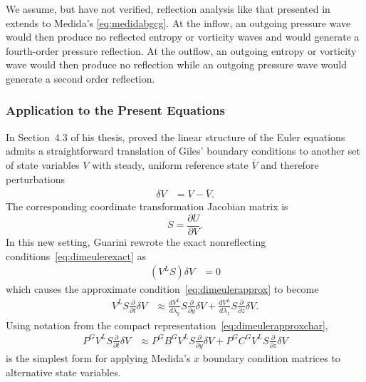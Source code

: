 We assume, but have not verified, reflection analysis like that presented in
\citet[\textsection{}3.7.4]{Giles1988Nonreflecting} extends to Medida's
\eqref{eq:medidabgcg}.  At the inflow, an outgoing pressure wave
would then produce no reflected entropy or vorticity waves and would generate a
fourth-order pressure reflection.  At the outflow, an outgoing entropy or
vorticity wave would then produce no reflection while an outgoing pressure wave
would generate a second order reflection.

\subsubsection{Application to the Present Equations}

In Section~4.3 of his thesis, \citet{Guarini1998} proved the linear
structure of the Euler equations admits a straightforward translation of Giles'
boundary conditions to another set of state variables $V$ with steady, uniform
reference state $\bar{V}$ and therefore perturbations
\begin{align}
  \label{eq:gilesperturbV}
  \delta{}V &= V - \bar{V}.
\end{align}
The corresponding coordinate transformation Jacobian matrix is
\[
   S = \frac{\partial\!U}{\partial\!V}.
\]
In this new setting, Guarini rewrote the exact nonreflecting
conditions~\eqref{eq:dimeulerexact} as
\begin{align}
  \left(V^L S\right) \delta{}V &= 0
\end{align}
which causes the approximate condition~\eqref{eq:dimeulerapprox} to become
\begin{align}
\label{eq:dimeulertransform}
  V^L
  S
  \frac{\partial\!}{\partial\!t}
  \delta{}V
  &\approx
  \frac{dV^L}{d\lambda_y}
  S
  \frac{\partial\!}{\partial\!y}
  \delta{}V
  +
  \frac{dV^L}{d\lambda_z}
  S
  \frac{\partial\!}{\partial\!z}
  \delta{}V.
\end{align}
Using notation from the compact representation~\eqref{eq:dimeulerapproxchar},
\begin{align}
\label{eq:dimeulertransformcharnot}
  P^G V^L S
  \frac{\partial\!}{\partial\!t}
  \delta{}V
  &\approx
  P^G B^G V^L S
  \frac{\partial\!}{\partial\!y}
  \delta{}V
  +
  P^G C^G V^L S
  \frac{\partial\!}{\partial\!z}
  \delta{}V
\end{align}
is the simplest form for applying Medida's $x$ boundary condition matrices to
alternative state variables.

